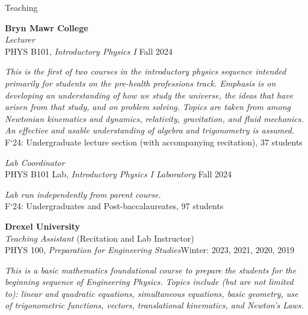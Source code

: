 \documentclass{resume} %
\newcommand{\forceindent}{\leavevmode{\parindent=1em\indent}}
\begin{document}


\begin{rSection}{Teaching}

\textbf{Bryn Mawr College} \\
\textit{Lecturer}\\
\forceindent PHYS B101, \textit{Introductory Physics I} \hfill{Fall 2024}
\begin{description}[leftmargin=2em, style=nextline]
\vspace{-0.5em}
\item[~] \textit{This is the first of two courses in the introductory physics sequence intended primarily for students on the pre-health professions track. Emphasis is on developing an understanding of how we study the universe, the ideas that have arisen from that study, and on problem solving. Topics are taken from among Newtonian kinematics and dynamics, relativity, gravitation, and fluid mechanics. An effective and usable understanding of algebra and trigonometry is assumed.}\\
\forceindent\forceindent F`24: Undergraduate lecture section (with accompanying recitation), 37 students
\end{description}
\textit{Lab Coordinator}\\
\forceindent PHYS B101 Lab, \textit{Introductory Physics I Laboratory} \hfill{Fall 2024}
\begin{description}[leftmargin=2em, style=nextline]
\vspace{-0.5em}
\item[~] \textit{Lab run independently from parent course.}\\
\forceindent\forceindent F`24: Undergraduates and Post-baccalaureates, 97 students
\end{description} 
\textbf{Drexel University} \\ 
\textit{Teaching Assistant} (Recitation and Lab Instructor)\\
\forceindent PHYS 100, \textit{Preparation for Engineering Studies}\hfill {Winter: 2023, 2021, 2020, 2019}
\begin{description}[leftmargin=2em, style=nextline]
\vspace{-0.5em}
\item[~] \textit{This is a basic mathematics foundational course to prepare the students for the beginning sequence of Engineering Physics. Topics include (but are not limited to): linear and quadratic equations, simultaneous equations, basic geometry, use of trigonometric functions, vectors, translational kinematics, and Newton’s Laws.} \\

\end{description}
\end{rSection}
\end{document}

